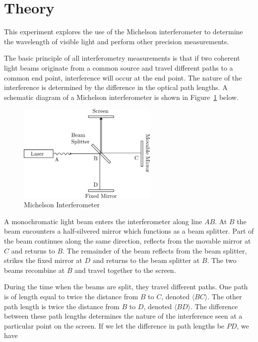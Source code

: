 \section{Theory}
This experiment explores the use of the Michelson interferometer to
determine the wavelength of visible light and perform other precision
measurements.

The basic principle of all interferometry measurements is that 
if two coherent light beams originate from a common source and 
travel different paths to a common end point, interference will 
occur at the end point. The nature of the interference is determined 
by the difference in the optical path lengths. A schematic diagram 
of a Michelson interferometer is shown in Figure~\ref{schematic} below.


\begin{figure}[htbp]
\begin{center}
\includegraphics[width=0.6\textwidth]{../images/inter.png}
\caption{Michelson Interferometer }
\label{schematic}
\end{center}
\end{figure}


A monochromatic light beam enters the interferometer along line $AB$. At
$B$ the beam encounters a half-silvered mirror which functions as a beam
splitter. Part of the beam continues along the same direction, reflects
from the movable mirror at $C$ and returns to $B$. The remainder of the beam
reflects from the beam splitter, strikes the fixed mirror at $D$ and
returns to the beam splitter at $B$. The two beams recombine at $B$ and
travel together to the screen. 

During the time when the beams are split, they travel different 
paths. One path is of length equal to twice the distance from 
$B$ to $C$, denoted $\langle BC\rangle$. The other path length is twice 
the distance from $B$ to $D$, denoted $\langle BD\rangle$. The difference 
between these path lengths determines the nature of the interference 
seen at a particular point on the screen. If we let the difference in path lengths be $PD$, we have

